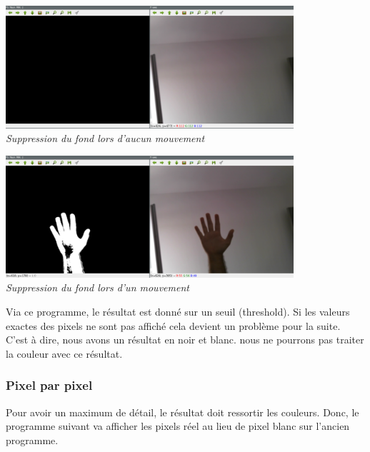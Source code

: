 \documentclass[12pt, french]{report}
\begin{document}
    \begin{center}
        \includegraphics[width=0.8\textwidth]{Images/BGSub/BGSub0.png}\\
        \textit{Suppression du fond lors d'aucun mouvement}
    \end{center}
    
    \begin{center}
        \includegraphics[width=0.8\textwidth]{Images/BGSub/BGSub1.png}\\
        \textit{Suppression du fond lors d'un mouvement}\\
    \end{center}    
    
    Via ce programme, le résultat est donné sur un seuil (threshold). Si les valeurs exactes des pixels ne sont pas affiché cela devient un problème pour la suite. C'est à dire, nous avons un résultat en noir et blanc. nous ne pourrons pas traiter la couleur avec ce résultat.
    
    \subsubsection{Pixel par pixel}
    Pour avoir un maximum de détail, le résultat doit ressortir les couleurs. Donc, le programme suivant va afficher les pixels réel au lieu de pixel blanc sur l'ancien programme.
    
\end{document}
